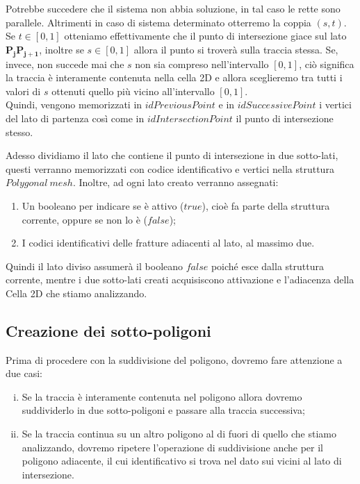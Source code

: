 \documentclass[a4paper]{article}
\newcommand{\B}{\mathbf}
\begin{document}
Potrebbe succedere che il sistema non abbia soluzione, in tal caso le rette sono parallele. Altrimenti in caso di sistema determinato otterremo la coppia $( s,t )$. Se $t \in [0,1]$ otteniamo effettivamente che il punto di intersezione giace sul lato $\B{P_{j}}\B{P_{j+1}}$, inoltre se $s \in [0,1]$ allora il punto si troverà sulla traccia stessa. Se, invece, non succede mai che $s$ non sia compreso nell'intervallo $[0,1]$, ciò significa la traccia è interamente contenuta nella cella 2D e allora sceglieremo tra tutti i valori di $s$ ottenuti quello più vicino all'intervallo $[0,1]$. \\ [1mm]
Quindi, vengono memorizzati in $idPreviousPoint$ e in $idSuccessivePoint$ i vertici del lato di partenza così come in $idIntersectionPoint$ il punto di intersezione stesso. 

Adesso dividiamo il lato che contiene il punto di intersezione in due sotto-lati, questi verranno memorizzati con codice identificativo e vertici nella struttura $Polygonal \ mesh$. Inoltre, ad ogni lato creato verranno assegnati: 
\begin{enumerate} 
\item Un booleano per indicare se è attivo ($true$), cioè fa parte della struttura corrente, oppure se non lo è ($false$);
\item I codici identificativi delle fratture adiacenti al lato, al massimo due.
\end{enumerate}

Quindi il lato diviso assumerà il booleano $false$ poiché esce dalla struttura corrente, mentre i due sotto-lati creati acquisiscono attivazione e l'adiacenza della Cella 2D che stiamo analizzando. 

\subsection{Creazione dei sotto-poligoni}
Prima di procedere con la suddivisione del poligono, dovremo fare attenzione a due casi: 
\begin{enumerate} [(i)]
\item Se la traccia è interamente contenuta nel poligono allora dovremo suddividerlo in due sotto-poligoni e passare alla traccia successiva;
\item Se la traccia continua su un altro poligono al di fuori di quello che stiamo analizzando, dovremo ripetere l'operazione di suddivisione anche per il poligono adiacente, il cui identificativo si trova nel dato sui vicini al lato di intersezione.
\end{enumerate}
\end{document}
